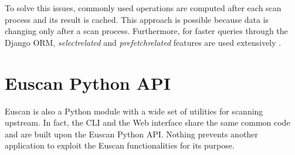 To solve this issues, commonly used operations are computed after each scan process and its result is cached. This approach is possible because data is changing only after a scan process. Furthermore, for faster queries through the Django ORM, \emph{select\textunderscore related} and \emph{prefetch\textunderscore related} features are used extensively \cite{django_orm}.

\section{Euscan Python API}
Euscan is also a Python module with a wide set of utilities for scanning upstream. In fact, the CLI and the Web interface share the same common code and are built upon the Euscan Python API. Nothing prevents another application to exploit the Euscan functionalities for its purpose.
